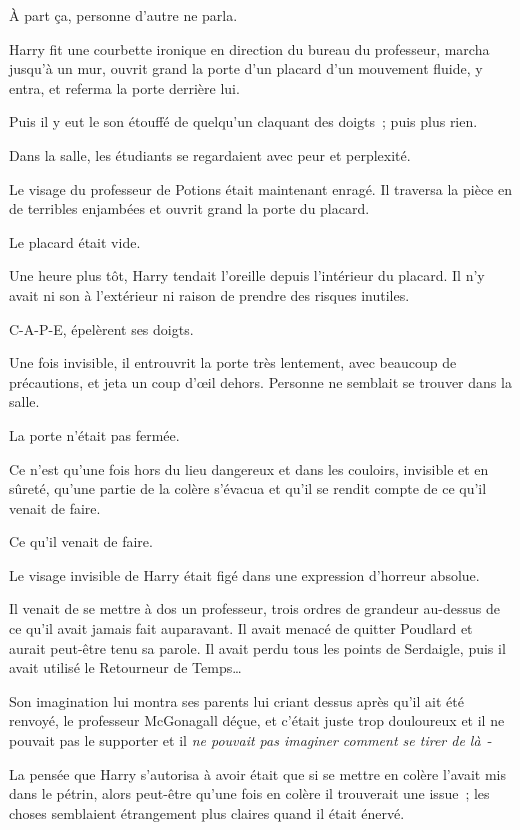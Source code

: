 À part ça, personne d'autre ne parla.

Harry fit une courbette ironique en direction du bureau du professeur, marcha jusqu'à un mur, ouvrit grand la porte d'un placard d'un mouvement fluide, y entra, et referma la porte derrière lui.

Puis il y eut le son étouffé de quelqu'un claquant des doigts~; puis plus rien.

Dans la salle, les étudiants se regardaient avec peur et perplexité.

Le visage du professeur de Potions était maintenant enragé. Il traversa la pièce en de terribles enjambées et ouvrit grand la porte du placard.

Le placard était vide.

\later

Une heure plus tôt, Harry tendait l'oreille depuis l'intérieur du placard. Il n'y avait ni son à l'extérieur ni raison de prendre des risques inutiles.

C-A-P-E, épelèrent ses doigts.

Une fois invisible, il entrouvrit la porte très lentement, avec beaucoup de précautions, et jeta un coup d'œil dehors. Personne ne semblait se trouver dans la salle.

La porte n'était pas fermée.

Ce n'est qu'une fois hors du lieu dangereux et dans les couloirs, invisible et en sûreté, qu'une partie de la colère s'évacua et qu'il se rendit compte de ce qu'il venait de faire.

Ce qu'il venait de faire.

Le visage invisible de Harry était figé dans une expression d'horreur absolue.

Il venait de se mettre à dos un professeur, trois ordres de grandeur au-dessus de ce qu'il avait jamais fait auparavant. Il avait menacé de quitter Poudlard et aurait peut-être tenu sa parole. Il avait perdu tous les points de Serdaigle, puis il avait utilisé le Retourneur de Temps…

Son imagination lui montra ses parents lui criant dessus après qu'il ait été renvoyé, le professeur McGonagall déçue, et c'était juste trop douloureux et il ne pouvait pas le supporter et il \emph{ne pouvait pas imaginer comment se tirer de là}~-

La pensée que Harry s'autorisa à avoir était que si se mettre en colère l'avait mis dans le pétrin, alors peut-être qu'une fois en colère il trouverait une issue~; les choses semblaient étrangement plus claires quand il était énervé.

